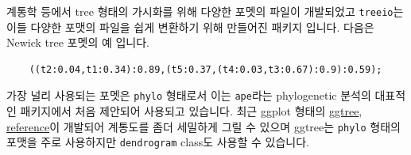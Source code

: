 \documentclass[
]{book}
\begin{document}
계통학 등에서 tree 형태의 가시화를 위해 다양한 포멧의 파일이 개발되었고 \texttt{treeio}는 이들 다양한 포맷의 파일을 쉽게 변환하기 위해 만들어진 패키지 입니다. 다음은 Newick tree 포멧의 예 입니다.

\begin{verbatim}
    ((t2:0.04,t1:0.34):0.89,(t5:0.37,(t4:0.03,t3:0.67):0.9):0.59); 
\end{verbatim}

가장 널리 사용되는 포멧은 \texttt{phylo} 형태로서 이는 \texttt{ape}라는 phylogenetic 분석의 대표적인 패키지에서 처음 제안되어 사용되고 있습니다. 최근 ggplot 형태의 \href{https://yulab-smu.top/treedata-book/chapter12.html}{ggtree}, \href{https://www.molecularecologist.com/2017/02/08/phylogenetic-trees-in-r-using-ggtree/}{reference}이 개발되어 계통도를 좀더 세밀하게 그릴 수 있으며 ggtree는 \texttt{phylo} 형태의 포맷을 주로 사용하지만 \texttt{dendrogram} class도 사용할 수 있습니다.
\end{document}
